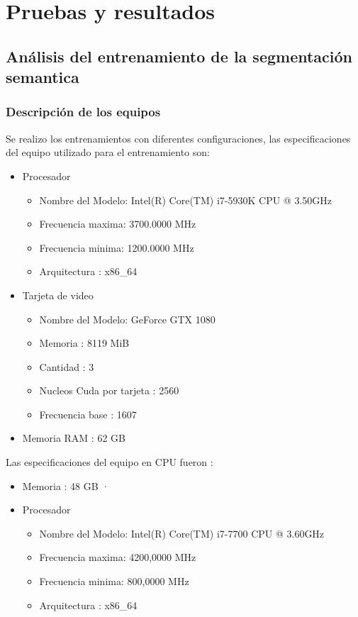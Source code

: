 \chapter{Pruebas y resultados}
\label{chap:pruebas}
\section{Análisis del entrenamiento de la segmentación semantica}
\subsection{Descripción de los equipos}
Se realizo los entrenamientos con diferentes configuraciones, las especificaciones del equipo utilizado para el entrenamiento son: 
\begin{itemize}
    \item Procesador
    \begin{itemize}
        \item Nombre del Modelo: Intel(R) Core(TM) i7-5930K CPU @ 3.50GHz
        \item Frecuencia maxima:  3700.0000 MHz
     \item Frecuencia minima: 1200.0000 MHz
     \item Arquitectura :  x86\_64
     
    \end{itemize}{}
    \item Tarjeta de video
    \begin{itemize}
        \item Nombre del Modelo: GeForce GTX 1080
        \item Memoria : 8119 MiB
        \item Cantidad : 3
        \item Nucleos Cuda por tarjeta : 2560
        \item Frecuencia base : 1607 
        
    \end{itemize}{}
    \item Memoria RAM : 62 GB 
\end{itemize}{}
Las especificaciones del equipo en CPU fueron :
\begin{itemize}
    \item Memoria : 48 GB
    ·   \item Procesador
    \begin{itemize}
        \item Nombre del Modelo:  Intel(R) Core(TM) i7-7700 CPU @ 3.60GHz
        \item Frecuencia maxima: 4200,0000 MHz
     \item Frecuencia minima: 800,0000 MHz
     \item Arquitectura :  x86\_64
     
    \end{itemize}{}
    

\end{itemize}{}
